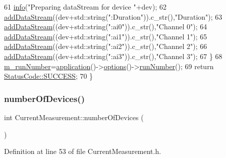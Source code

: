 \begin{DoxyCode}
61     \hyperlink{classObject_a644fd329ea4cb85f54fa6846484b84a8}{info}(\textcolor{stringliteral}{"Preparing dataStream for device "}+dev);
62     \hyperlink{classProcessus_a308c8f193802f1d1ab49d4447d0cb281}{addDataStream}((dev+std::string(\textcolor{stringliteral}{":Duration"})).c\_str(),\textcolor{stringliteral}{"Duration"});
63     \hyperlink{classProcessus_a308c8f193802f1d1ab49d4447d0cb281}{addDataStream}((dev+std::string(\textcolor{stringliteral}{":ai0"})).c\_str(),\textcolor{stringliteral}{"Channel 0"});
64     \hyperlink{classProcessus_a308c8f193802f1d1ab49d4447d0cb281}{addDataStream}((dev+std::string(\textcolor{stringliteral}{":ai1"})).c\_str(),\textcolor{stringliteral}{"Channel 1"});
65     \hyperlink{classProcessus_a308c8f193802f1d1ab49d4447d0cb281}{addDataStream}((dev+std::string(\textcolor{stringliteral}{":ai2"})).c\_str(),\textcolor{stringliteral}{"Channel 2"});
66     \hyperlink{classProcessus_a308c8f193802f1d1ab49d4447d0cb281}{addDataStream}((dev+std::string(\textcolor{stringliteral}{":ai3"})).c\_str(),\textcolor{stringliteral}{"Channel 3"});
67   \}
68   \hyperlink{classCurrentMeasurement_a5a7bfe59821148e4e9e2998c73b635a8}{m\_runNumber}=\hyperlink{Tools_8h_a27885a3c35afe79029fb830f32f66458}{application}()->\hyperlink{classApplication_ada7cc0e8db586985f1435aee0c79f47d}{options}()->\hyperlink{classOptions_a2d9447919fe90f9ce8df5530526cbb27}{runNumber}();
69   \textcolor{keywordflow}{return} \hyperlink{classStatusCode_a6f565cbeadc76d14c72f047e5e85eb4badd0da38d3ba0d922efd1f4619bc37ad8}{StatusCode::SUCCESS};
70 \}
\end{DoxyCode}
\mbox{\label{classCurrentMeasurement_a646a9953d7aef3bad2e2dacaab31c241}} 
\subsubsection{\texorpdfstring{number\+Of\+Devices()}{numberOfDevices()}}
{\footnotesize\ttfamily int Current\+Measurement\+::number\+Of\+Devices (\begin{DoxyParamCaption}{ }\end{DoxyParamCaption})\hspace{0.3cm}{\ttfamily [inline]}}



Definition at line 53 of file Current\+Measurement.\+h.



